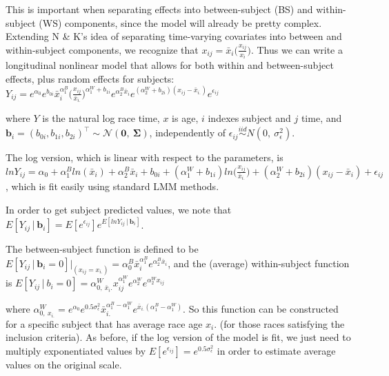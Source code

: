 \documentclass[
  9pt,
  ignorenonframetext,
]{beamer}
\begin{document}
\begin{frame}{}
\protect\hypertarget{section-6}{}
This is important when separating effects into between-subject (BS) and
within-subject (WS) components, since the model will already be pretty
complex. Extending N \& K's idea of separating time-varying covariates
into between and within-subject components, we recognize that
\(x_{ij}=\bar x_i \Big(\frac {x_{ij}} {x_i} \Big)\). Thus we can write a
longitudinal nonlinear model that allows for both within and
between-subject effects, plus random effects for subjects:
\(Y_{ij}=e^{\alpha _0 } e^{b_{0i}} \bar x_i^{\alpha _1^B } \Big(\frac {x_{ij}} {\bar x_{i.}} \Big)^{\alpha _1^W+b_{1i}} e^{\alpha _2^B \bar x_i } e^{(\alpha _2^W+b_{2i})(x_{ij}- \bar x_{i.})} e^{\epsilon_{ij}}\)

where \(Y\) is the natural log race time, \(x\) is age, \(i\) indexes
subject and \(j\) time, and
\(\pmb b_i=(b_{0i},b_{1i},b_{2i})^{\top} \sim \mathcal N(\pmb 0,\ \pmb \Sigma)\),
independently of
\(\epsilon_{ij} \stackrel {iid} \sim N(0,\ \sigma_\epsilon ^2)\).

The log version, which is linear with respect to the parameters, is
\(lnY_{ij}=\alpha _0+\alpha _1^B ln(\bar x_i)+\alpha _2^B \bar x_i+b_{0i} +(\alpha _1^W+b_{1i})ln\Big(\frac {x_{ij}} {\bar x_{i.}}\Big)+(\alpha _2^W+b_{2i})(x_{ij}-\bar x_i)+\epsilon_{ij}\),
which is fit easily using standard LMM methods.
\end{frame}

\begin{frame}{}
\protect\hypertarget{section-7}{}
In order to get subject predicted values, we note that
\(E[Y_{ij}│\pmb b_i]= E[e^{\epsilon _{ij} }]e^{E[lnY_{ij}│\pmb b_i]}\).

The between-subject function is defined to be
\(E[Y_{ij}│\pmb b_i=0] |_{(x_{ij}=x_{i.})}=\alpha _0^B \bar x_i^{\alpha _1^B} e^{\alpha _2^B \bar x_i}\),
and the (average) within-subject function is
\(E[Y_{ij}│b_i=0]=\alpha _{0,\ \bar x_i.}^W x_{ij}^{\alpha_1^W} e^{\alpha_2^W} e^{\alpha _2^W x_{ij}}\)

where
\(\alpha _{0,\ x_{i.}}^W=e^{\alpha _0 } e^{0.5\sigma_\epsilon ^2} \bar x_{i.}^{\alpha _1^B-\alpha _1^W} e^{\bar x_{i.} (\alpha _1^B-\alpha _1^W)}\).
So this function can be constructed for a specific subject that has
average race age \(x_i\). (for those races satisfying the inclusion
criteria). As before, if the log version of the model is fit, we just
need to multiply exponentiated values by
\(E[e^{\epsilon_{ij}}]=e^{0.5\sigma_\epsilon ^2}\) in order to estimate
average values on the original scale.
\end{frame}
\end{document}

